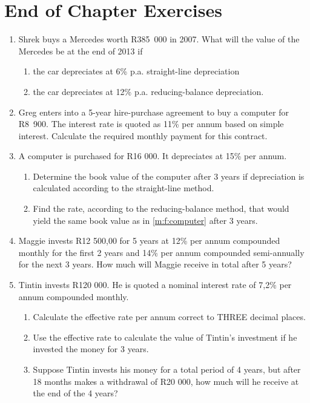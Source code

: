 \section{End of Chapter Exercises}
\begin{enumerate}
\item{Shrek buys a Mercedes worth R385~000 in 2007. What will the value of the Mercedes be at the end of 2013 if
\begin{enumerate}
\item{the car depreciates at 6\% p.a. straight-line depreciation}
\item{the car depreciates at 12\% p.a. reducing-balance depreciation.}
\end{enumerate}}

\item{Greg enters into a 5-year hire-purchase agreement to buy a computer for R8~900. The interest rate is quoted as 11\% per annum based on simple interest. Calculate the required monthly payment for this contract.}

\item{A computer is purchased for R16 000. It depreciates at 15\% per annum.
\begin{enumerate}
\item{Determine the book value of the computer after 3 years if depreciation
is calculated according to the straight-line method.}
\label{m:f:computer}
\item{Find the rate, according to the reducing-balance method, that would
yield the same book value as in \ref{m:f:computer} after 3 years.}
\end{enumerate}}

\item{Maggie invests R12 500,00 for 5 years at 12\% per annum compounded monthly for
the first 2 years and 14\% per annum compounded semi-annually for the next 3
years. How much will Maggie receive in total after 5 years?}

\item{Tintin invests R120 000. He is quoted a nominal interest rate of 7,2\% per annum compounded monthly.
\begin{enumerate}
\item{Calculate the effective rate per annum correct to THREE decimal
places.}
\item{Use the effective rate to calculate the value of Tintin's investment if
he invested the money for 3 years.}
\item{Suppose Tintin invests his money for a total period of 4 years, but
after 18 months makes a withdrawal of R20 000, how much will he
receive at the end of the 4 years?}
\end{enumerate}}


\end{enumerate}
